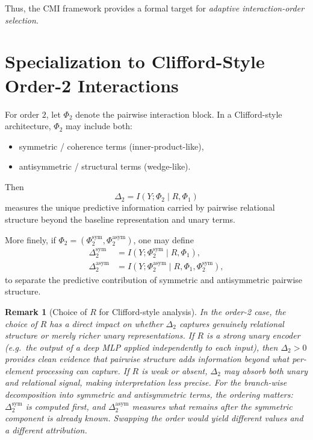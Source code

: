 \documentclass[11pt]{article}
\newtheorem{remark}{Remark}
\newcommand{\1}{\mathbf{1}}
\begin{document}
Thus, the CMI framework provides a formal target for \emph{adaptive interaction-order selection}.

\section{Specialization to Clifford-Style Order-2 Interactions}

For order $2$, let $\Phi_2$ denote the pairwise interaction block. In a Clifford-style architecture,
$\Phi_2$ may include both:
\begin{itemize}[leftmargin=1.5em]
    \item symmetric / coherence terms (inner-product-like),
    \item antisymmetric / structural terms (wedge-like).
\end{itemize}

Then
\[
\Delta_2 = I(Y;\Phi_2 \mid R,\Phi_1)
\]
measures the unique predictive information carried by pairwise relational structure beyond the
baseline representation and unary terms.

More finely, if $\Phi_2=(\Phi_2^{\mathrm{sym}},\Phi_2^{\mathrm{asym}})$, one may define
\begin{align}
\Delta_2^{\mathrm{sym}}
&=
I(Y;\Phi_2^{\mathrm{sym}} \mid R,\Phi_1),
\\
\Delta_2^{\mathrm{asym}}
&=
I(Y;\Phi_2^{\mathrm{asym}} \mid R,\Phi_1,\Phi_2^{\mathrm{sym}}),
\end{align}
to separate the predictive contribution of symmetric and antisymmetric pairwise structure.

\begin{remark}[Choice of $R$ for Clifford-style analysis]
In the order-2 case, the choice of $R$ has a direct impact on whether $\Delta_2$ captures
genuinely \emph{relational} structure or merely richer unary representations.
If $R$ is a strong unary encoder (e.g.\ the output of a deep MLP applied independently to each
input), then $\Delta_2 > 0$ provides clean evidence that pairwise structure adds information
beyond what per-element processing can capture.
If $R$ is weak or absent, $\Delta_2$ may absorb both unary and relational signal, making
interpretation less precise.
For the branch-wise decomposition into symmetric and antisymmetric terms, the ordering matters:
$\Delta_2^{\mathrm{sym}}$ is computed first, and $\Delta_2^{\mathrm{asym}}$ measures what remains
after the symmetric component is already known.
Swapping the order would yield different values and a different attribution.
\end{remark}
\end{document}
